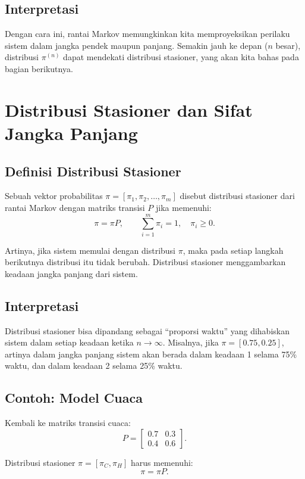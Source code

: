 \documentclass{bukumjh}
\begin{document}
\subsection{Interpretasi}

Dengan cara ini, rantai Markov memungkinkan kita memproyeksikan perilaku sistem dalam jangka pendek maupun panjang. Semakin jauh ke depan ($n$ besar), distribusi $\pi^{(n)}$ dapat mendekati {\jsg distribusi stasioner}, yang akan kita bahas pada bagian berikutnya.

\section{Distribusi Stasioner dan Sifat Jangka Panjang}

\subsection{Definisi Distribusi Stasioner}

Sebuah vektor probabilitas $\pi = [\pi_1, \pi_2, \dots, \pi_m]$ disebut {\jsg distribusi stasioner} dari rantai Markov dengan matriks transisi $P$ jika memenuhi:
\[
\pi = \pi P, \qquad \sum_{i=1}^m \pi_i = 1, \quad \pi_i \geq 0.
\]

Artinya, jika sistem memulai dengan distribusi $\pi$, maka pada setiap langkah berikutnya distribusi itu tidak berubah. Distribusi stasioner menggambarkan keadaan jangka panjang dari sistem.

\subsection{Interpretasi}

Distribusi stasioner bisa dipandang sebagai “proporsi waktu” yang dihabiskan sistem dalam setiap keadaan ketika $n \to \infty$. Misalnya, jika $\pi = [0.75, 0.25]$, artinya dalam jangka panjang sistem akan berada dalam keadaan 1 selama 75\% waktu, dan dalam keadaan 2 selama 25\% waktu.

\subsection{Contoh: Model Cuaca}

Kembali ke matriks transisi cuaca:
\[
P =
\begin{bmatrix}
0.7 & 0.3 \\
0.4 & 0.6
\end{bmatrix}.
\]

Distribusi stasioner $\pi = [\pi_C, \pi_H]$ harus memenuhi:
\[
\pi = \pi P.
\]
\end{document}
